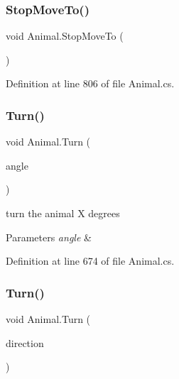 \subsubsection{\texorpdfstring{Stop\+Move\+To()}{StopMoveTo()}}
{\footnotesize\ttfamily void Animal.\+Stop\+Move\+To (\begin{DoxyParamCaption}{ }\end{DoxyParamCaption})}



Definition at line 806 of file Animal.\+cs.

\mbox{\label{class_animal_a676f9175b4ab6957d904e9bb62fdb3b4}} 
\subsubsection{\texorpdfstring{Turn()}{Turn()}\hspace{0.1cm}{\footnotesize\ttfamily [1/2]}}
{\footnotesize\ttfamily void Animal.\+Turn (\begin{DoxyParamCaption}\item[{float}]{angle }\end{DoxyParamCaption})}



turn the animal X degrees 


\begin{DoxyParams}{Parameters}
{\em angle} & \\
\hline
\end{DoxyParams}


Definition at line 674 of file Animal.\+cs.

\mbox{\label{class_animal_a9bd4c172143d8daa1f6b3ad12d6a67c2}} 
\subsubsection{\texorpdfstring{Turn()}{Turn()}\hspace{0.1cm}{\footnotesize\ttfamily [2/2]}}
{\footnotesize\ttfamily void Animal.\+Turn (\begin{DoxyParamCaption}\item[{\mbox{\hyperlink{_animal_8cs_a57d10208ebba781ae206546ada2002b6}{F\+A\+C\+I\+N\+G\+\_\+\+D\+IR}}}]{direction }\end{DoxyParamCaption})}



